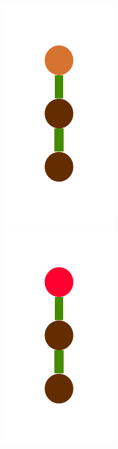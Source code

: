 \documentclass[a4paper,10pt]{article}
\begin{document}
\begin{figure}[t]
\includegraphics[scale=.26]{./figures/4-2-4-constructor-induction-pre-6.pdf}
\includegraphics[scale=.26]{./figures/4-2-4-constructor-induction-pre-7.pdf}

\end{figure}
\end{document}
